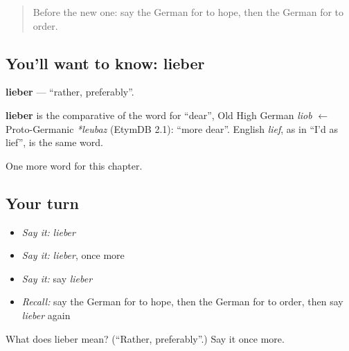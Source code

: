 \begin{quote}
Before the new one: say the German for to hope, then the German for to order.
\end{quote}

\subsection*{You'll want to know: lieber}
\textbf{lieber} — \textquotedblleft{}rather, preferably\textquotedblright{}.

\begin{cousinweb}
\textbf{lieber} is the comparative of the word for \textquotedblleft{}dear\textquotedblright{}, Old High German \emph{liob} $\leftarrow$ Proto-Germanic \emph{*leubaz} (EtymDB 2.1): \textquotedblleft{}more dear\textquotedblright{}. English \emph{lief}, as in \textquotedblleft{}I'd as lief\textquotedblright{}, is the same word.
\end{cousinweb}

\begin{grammarlens}[title={What you've built}]
One more word for this chapter.
\end{grammarlens}

\subsection*{Your turn}
\begin{itemize}
\raggedright
  \item \emph{Say it:} \emph{lieber}
  \item \emph{Say it:} \emph{lieber}, once more
  \item \emph{Say it:} say \emph{lieber}
  \item \emph{Recall:} say the German for to hope, then the German for to order, then say \emph{lieber} again
\end{itemize}

\begin{tcolorbox}[breakable,colback=teal!4,colframe=teal!35!black,title={Before you move on}]
What does lieber mean? (\textquotedblleft{}Rather, preferably\textquotedblright{}.) Say it once more.
\end{tcolorbox}
